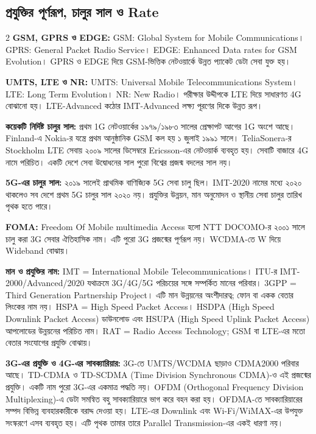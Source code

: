 \subsection{প্রযুক্তির পূর্ণরূপ, চালুর সাল ও Rate}
\begin{multicols}{2}
\textbf{GSM, GPRS ও EDGE:} GSM: Global System for Mobile Communications। GPRS: General Packet Radio Service। EDGE: Enhanced Data rates for GSM Evolution। GPRS ও EDGE দিয়ে GSM-ভিত্তিক নেটওয়ার্কে উন্নত প্যাকেট ডেটা সেবা যুক্ত হয়।\par
\textbf{UMTS, LTE ও NR:} UMTS: Universal Mobile Telecommunications System। LTE: Long Term Evolution। NR: New Radio। পরীক্ষার উদ্দীপকে LTE দিয়ে সাধারণত 4G বোঝানো হয়। LTE-Advanced কঠোর IMT-Advanced লক্ষ্য পূরণের দিকে উন্নত রূপ।\par
\end{multicols}

\textbf{কয়েকটি নির্দিষ্ট চালুর সাল:} প্রথম 1G নেটওয়ার্কের ১৯৭৯/১৯৮৩ সালের প্রেক্ষাপট আগের 1G অংশে আছে। Finland-এ Nokia-র যন্ত্রে প্রথম আনুষ্ঠানিক GSM কল হয় ১ জুলাই ১৯৯১ সালে। TeliaSonera-র Stockholm LTE সেবায় ২০০৯ সালের ডিসেম্বরে Ericsson-এর নেটওয়ার্ক ব্যবহৃত হয়। সেবাটি বাজারে 4G নামে পরিচিত। একটি দেশে সেবা উদ্বোধনের সাল পুরো বিশ্বের প্রজন্ম বদলের সাল নয়।

\textbf{5G-এর চালুর সাল:} ২০১৯ সালেই প্রাথমিক বাণিজ্যিক 5G সেবা চালু ছিল। IMT-2020 নামের মধ্যে ২০২০ থাকলেও সব দেশে প্রথম 5G চালুর সাল ২০২০ নয়। প্রযুক্তির উন্নয়ন, মান অনুমোদন ও স্থানীয় সেবা চালুর তারিখ পৃথক হতে পারে।

\textbf{FOMA:} Freedom Of Mobile multimedia Access হলো NTT DOCOMO-র ২০০১ সালে চালু করা 3G সেবার ঐতিহাসিক নাম। এটি পুরো 3G প্রজন্মের পূর্ণরূপ নয়। WCDMA-তে W দিয়ে Wideband বোঝায়।

\textbf{মান ও প্রযুক্তির নাম:} IMT = International Mobile Telecommunications। ITU-র IMT-2000/Advanced/2020 যথাক্রমে 3G/4G/5G পরিচয়ের সঙ্গে সম্পর্কিত মানের পরিবার। 3GPP = Third Generation Partnership Project। এটি মান উন্নয়নের অংশীদারত্ব; ফোন বা একক বেতার লিংকের নাম নয়। HSPA = High Speed Packet Access। HSDPA (High Speed Downlink Packet Access) ডাউনলোড এবং HSUPA (High Speed Uplink Packet Access) আপলোডের উন্নয়নের পরিচিত নাম। RAT = Radio Access Technology; GSM বা LTE-এর মতো বেতার সংযোগের প্রযুক্তি বোঝায়।

\textbf{3G-এর প্রযুক্তি ও 4G-এর সাবক্যারিয়ার:} 3G-তে UMTS/WCDMA ছাড়াও CDMA2000 পরিবার আছে। TD-CDMA ও TD-SCDMA (Time Division Synchronous CDMA)-ও এই প্রজন্মের প্রযুক্তি। একটি নাম পুরো 3G-এর একমাত্র পদ্ধতি নয়। OFDM (Orthogonal Frequency Division Multiplexing)-এ ডেটা সমন্বিত বহু সাবক্যারিয়ারে ভাগ করে বহন করা হয়। OFDMA-তে সাবক্যারিয়ারের সম্পদ বিভিন্ন ব্যবহারকারীকে বরাদ্দ দেওয়া হয়। LTE-এর Downlink এবং Wi-Fi/WiMAX-এর উপযুক্ত সংস্করণে এসব ব্যবহৃত হয়। এটি পৃথক তামার তারে Parallel Transmission-এর একই ধারণা নয়।


